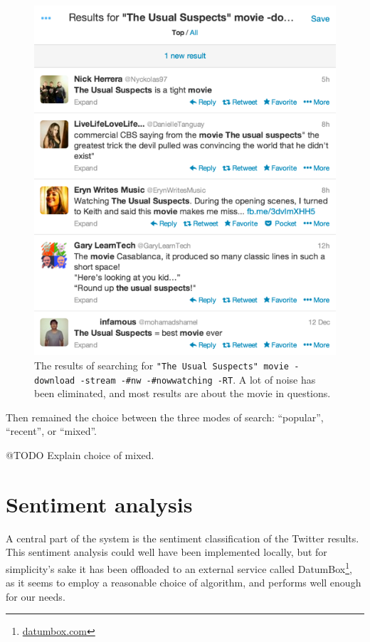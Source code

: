 \begin{figure}[h]
  \centering
    \includegraphics{Figures/search_filtered}
  \caption{The results of searching for \texttt{"The Usual Suspects" movie -download -stream -\#nw -\#nowwatching -RT}. A lot of noise has been eliminated, and most results are about the movie in questions.}
  \label{fig:search_filtered}
\end{figure}

Then remained the choice between the three modes of search: ``popular'', ``recent'', or ``mixed''.

@TODO Explain choice of mixed.


\section{Sentiment analysis} %
\label{sec:sentiment_analysis_impl}

A central part of the system is the sentiment classification of the Twitter results. This sentiment analysis could well have been implemented locally, but for simplicity's sake it has been offloaded to an external service called DatumBox\footnote{\url{datumbox.com}}, as it seems to employ a reasonable choice of algorithm, and performs well enough for our needs.

